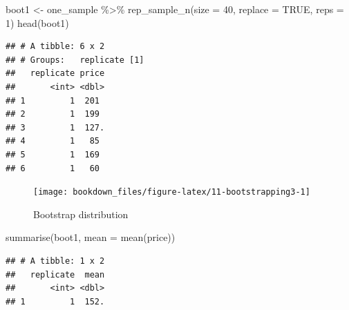 \documentclass[
]{krantz}
\makeatletter
\newenvironment{Shaded}{\begin{snugshade}}{\end{snugshade}}
\newcommand{\AttributeTok}[1]{\textcolor[rgb]{0.61,0.61,0.61}{#1}}
\newcommand{\ConstantTok}[1]{\textcolor[rgb]{0,0,0}{#1}}
\newcommand{\DecValTok}[1]{\textcolor[rgb]{0.06,0.06,0.06}{#1}}
\newcommand{\FunctionTok}[1]{\textcolor[rgb]{0,0,0}{#1}}
\newcommand{\NormalTok}[1]{#1}
\newcommand{\OtherTok}[1]{\textcolor[rgb]{0.37,0.37,0.37}{#1}}
\newcommand{\SpecialCharTok}[1]{\textcolor[rgb]{0,0,0}{#1}}
\newcommand{\StringTok}[1]{\textcolor[rgb]{0.5,0.5,0.5}{#1}}
\newenvironment{kframe}{%
\medskip{}
\setlength{\fboxsep}{.8em}
 \def\at@end@of@kframe{}%
 \ifinner\ifhmode%
  \def\at@end@of@kframe{\end{minipage}}%
  \begin{minipage}{\columnwidth}%
 \fi\fi%
 \def\FrameCommand##1{\hskip\@totalleftmargin \hskip-\fboxsep
 \colorbox{shadecolor}{##1}\hskip-\fboxsep
     \hskip-\linewidth \hskip-\@totalleftmargin \hskip\columnwidth}%
 \MakeFramed {\advance\hsize-\width
   \@totalleftmargin\z@ \linewidth\hsize
   \@setminipage}}%
 {\par\unskip\endMakeFramed%
 \at@end@of@kframe}
\renewenvironment{Shaded}{\begin{kframe}}{\end{kframe}}
\makeatother
\begin{document}
\begin{Shaded}
\begin{Highlighting}[]
\NormalTok{boot1 }\OtherTok{\textless{}{-}}\NormalTok{ one\_sample }\SpecialCharTok{\%\textgreater{}\%}
  \FunctionTok{rep\_sample\_n}\NormalTok{(}\AttributeTok{size =} \DecValTok{40}\NormalTok{, }\AttributeTok{replace =} \ConstantTok{TRUE}\NormalTok{, }\AttributeTok{reps =} \DecValTok{1}\NormalTok{)}
\FunctionTok{head}\NormalTok{(boot1)}
\end{Highlighting}
\end{Shaded}

\begin{verbatim}
## # A tibble: 6 x 2
## # Groups:   replicate [1]
##   replicate price
##       <int> <dbl>
## 1         1  201 
## 2         1  199 
## 3         1  127.
## 4         1   85 
## 5         1  169 
## 6         1   60
\end{verbatim}

\begin{Shaded}
\end{Shaded}

\begin{figure}
\texttt{[image: bookdown\_files/figure-latex/11-bootstrapping3-1]} \caption{Bootstrap distribution}\label{fig:11-bootstrapping3}
\end{figure}

\begin{Shaded}
\begin{Highlighting}[]
\FunctionTok{summarise}\NormalTok{(boot1, }\AttributeTok{mean =} \FunctionTok{mean}\NormalTok{(price))}
\end{Highlighting}
\end{Shaded}

\begin{verbatim}
## # A tibble: 1 x 2
##   replicate  mean
##       <int> <dbl>
## 1         1  152.
\end{verbatim}
\end{document}
